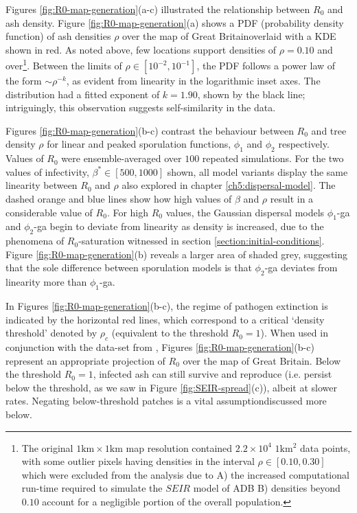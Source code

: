 Figures \ref{fig:R0-map-generation}(a-c) illustrated the relationship between $R_0$ and ash density.
Figure \ref{fig:R0-map-generation}(a) shows a PDF (probability density function) of ash densities $\rho$ over the map of Great Britain\textemdash overlaid with a KDE shown in red.
As noted above, few locations support densities of $\rho=0.10$ and over\footnote{
The original $\mathrm{1km \times 1km}$ map resolution contained $2.2\times 10^4$ $1\mathrm{km^2}$ data points, 
with some outlier pixels having densities in the interval $\rho \in [0.10, 0.30]$ which were excluded from the analysis due to 
A) the increased computational run-time required to simulate the $SEIR$ model of ADB  
B) densities beyond $0.10$ account for a negligible portion of the overall population.}. 
Between the limits of $\rho \in [10^{-2}, 10^{-1}]$, the PDF follows a power law of the form $\sim \rho ^{-k}$, as evident from linearity in the logarithmic inset axes.
The distribution had a fitted exponent of $k=1.90$, shown by the black line; 
intriguingly, this observation suggests self-similarity in the data.

Figures \ref{fig:R0-map-generation}(b-c) contrast the behaviour between $R_0$ and tree density $\rho$ for linear and peaked sporulation functions, $\phi_1$ and $\phi_2$ respectively.
Values of $R_0$ were ensemble-averaged over $100$ repeated simulations.
For the two values of infectivity, $\beta^*\in [500, 1000]$ shown, all model variants display the same linearity between $R_0$ and $\rho$ \textemdash also explored in chapter \ref{ch5:dispersal-model}.
The dashed orange and blue lines show how high values of $\beta$ and $\rho$ result in a considerable value of $R_0$.
For high $R_0$ values, the Gaussian dispersal models $\phi_1$-ga and $\phi_2$-ga begin to deviate from linearity as density is increased,
due to the phenomena of $R_0$-saturation witnessed in section \ref{section:initial-conditions}.
Figure \ref{fig:R0-map-generation}(b) reveals a larger area of shaded grey, 
suggesting that the sole difference between sporulation models is that $\phi_2$-ga deviates from linearity more than $\phi_1$-ga.

In Figures \ref{fig:R0-map-generation}(b-c), the regime of pathogen extinction is indicated by the horizontal red lines, 
which correspond to a critical `density threshold' denoted by $\rho_c$ (equivalent to the threshold $R_0 = 1$).
When used in conjunction with the data-set from \cite{hill.data}, Figures \ref{fig:R0-map-generation}(b-c) represent an appropriate projection of $R_0$ over the map of Great Britain.
Below the threshold $R_0=1$, infected ash can still survive and reproduce (i.e. persist below the threshold, as we saw in Figure \ref{fig:SEIR-spread}(c)), albeit at slower rates.
Negating below-threshold patches is a vital assumption\textemdash discussed more below.

